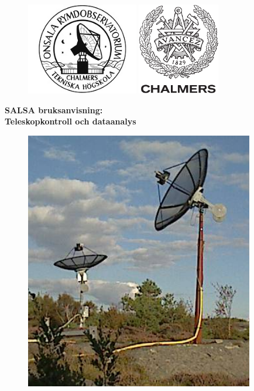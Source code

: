 \begin{titlepage}

\begin{figure}[t]
\vspace{-2cm}
\centering
\includegraphics[height=4cm]{../figures/OSO-logo.jpg}
\hspace{4cm}
\includegraphics[height=4cm]{../figures/CHALMERS-logo.pdf}
\vspace{1cm}
\end{figure}

\begin{center}
{\bf
{\Huge SALSA bruksanvisning:}\\
\bigskip
{\Huge Teleskopkontroll och dataanalys}
}
\end{center}

\begin{figure}[!h]
\centering
\includegraphics[width=10cm]{../figures/SALSA.png}
\end{figure}



\end{titlepage}
